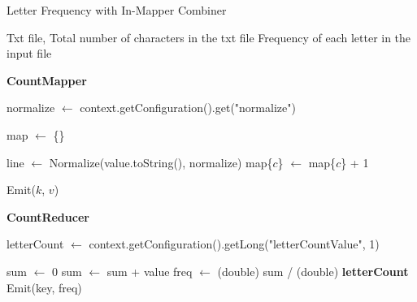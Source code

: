     \begin{algorithm}[H]
    \caption{Letter Frequency with In-Mapper Combiner}
    \begin{algorithmic}[1]
    \Require Txt file, Total number of characters in the txt file
    \Ensure Frequency of each letter in the input file
    
    \vspace{1em}

    \Statex
    \noindent \textbf{CountMapper}
        
            \State normalize $\leftarrow$ context.getConfiguration().get("normalize")
        
        \State map $\leftarrow$ \{\}
        
        \EndProcedure

        \vspace{1em}

            \State line $\leftarrow$ Normalize(value.toString(), normalize)
                \State map\{$c$\} $\leftarrow$ map\{$c$\} + 1
            
            \EndFor
        \EndProcedure

        \vspace{1em}

             
                \State Emit($k$, $v$)
            \EndFor
        \EndProcedure
    
        \vspace{1em}

    \Statex
    \noindent \textbf{CountReducer}
        
            \State letterCount $\leftarrow$ context.getConfiguration().getLong("letterCountValue", 1)
        \EndProcedure

        \vspace{1em}

            \State sum $\leftarrow$ 0
                \State sum $\leftarrow$ sum + value
            \EndFor
            \State freq $\leftarrow$ (double) sum / (double) \textbf{letterCount}
            \State Emit(key, freq)
        \EndProcedure

    \end{algorithmic}
    \end{algorithm}
    